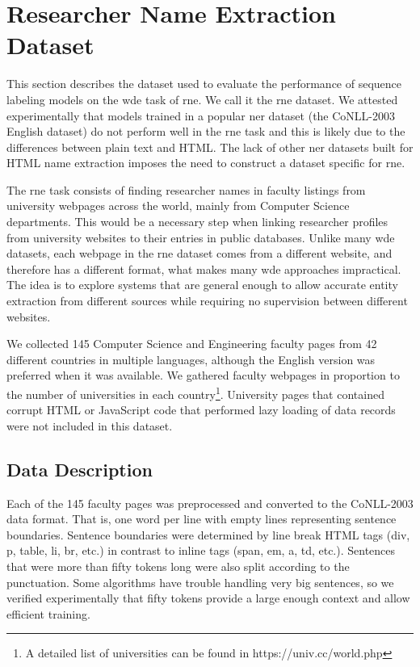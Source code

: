 \documentclass{nle}
\begin{document}
\section{Researcher Name Extraction Dataset}
\label{cha:dataset}

This section describes the dataset used to evaluate the performance of sequence labeling models
on the \gls{wde} task of \gls{rne}. We call it the \gls{rne} dataset.
We attested experimentally that 
models trained in a popular \gls{ner} dataset (the {CoNLL-2003} English dataset) do not perform 
well in the \gls{rne} task and this is likely due to the differences
between plain text and HTML. The lack of other \gls{ner} 
datasets built for HTML name extraction imposes the need to construct a dataset specific for \gls{rne}.

The \gls{rne} task consists of finding researcher names in faculty listings from university 
webpages across the world, mainly from Computer Science departments.
This would be a necessary step when linking researcher profiles from university 
websites to their entries in public databases. Unlike many
\gls{wde} datasets, each webpage in the \gls{rne} dataset comes from a different 
website, and therefore has a different format, what makes many \gls{wde}
approaches impractical. The idea is to explore systems that are general 
enough to allow accurate entity extraction from different sources while requiring
no supervision between different websites. 

We collected 145 Computer Science and Engineering faculty pages from 42 different countries in
multiple languages, although the English version was preferred when it was available.
We gathered faculty webpages in proportion to
the number of universities in each country\footnote{A detailed list of universities can
be found in https://univ.cc/world.php}. 
University pages that contained 
corrupt HTML or JavaScript code that performed lazy loading of data records were
not included in this dataset.

\subsection{Data Description} 
\label{sec:data_description}

Each of the 145 faculty pages was preprocessed and converted
to the {CoNLL-2003} data format. That is, one word per line with empty lines representing
sentence boundaries. Sentence boundaries were determined by line break HTML tags
(div, p, table, li, br, etc.) in contrast to inline tags (span, em, a, td, etc.). 
Sentences that were more than fifty tokens long were also split according to the
punctuation. Some algorithms have trouble handling very big sentences, so we verified
experimentally that fifty tokens provide a large enough context 
and allow efficient training. 
\end{document}
